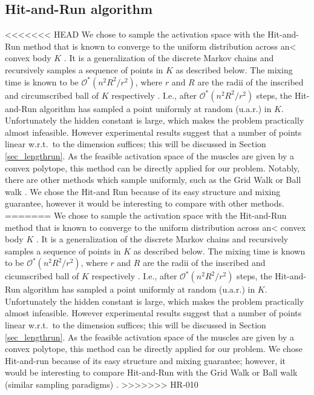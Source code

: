 \subsection{Hit-and-Run algorithm}
\label{ss:hitrun}
<<<<<<< HEAD
We chose to sample the activation space with the Hit-and-Run method that is known to converge to the uniform distribution across an< convex body $K$ \cite{smith1984efficient}. It is a generalization of the discrete Markov chains and recursively samples a sequence of points in $K$ as described below. The mixing time is known to be $\mathcal{O}^*(n^2R^2/r^2)$, where $r$ and $R$ are the radii of the inscribed and circumscribed ball of $K$ respectively \cite{Dyer, Lovasz}. I.e., after $\mathcal{O}^*(n^2R^2/r^2)$ steps, the Hit-and-Run algorithm has sampled a point uniformly at random (u.a.r.) in $K$. Unfortunately the hidden constant is large, which makes the problem practically almost infeasible. However experimental results suggest that a number of points linear w.r.t.\ to the dimension suffices; this will be discussed in Section \ref{sec_lengthrun}.
As the feasible activation space of the muscles are given by a convex polytope, this method can be directly applied for our problem. Notably, there are other methods which sample uniformly, such as the Grid Walk or Ball walk \cite{Vempala}. We chose the Hit-and Run because of its easy structure and mixing guarantee, however it would be interesting to compare with other methods.
=======
We chose to sample the activation space with the Hit-and-Run method that is known to converge to the uniform distribution across an< convex body $K$ \cite{smith1984efficient}.
It is a generalization of the discrete Markov chains and recursively samples a sequence of points in $K$ as described below.
The mixing time is known to be $\mathcal{O}^*(n^2R^2/r^2)$, where $r$ and $R$ are the radii of the inscribed and cicumscribed ball of $K$ respectively \cite{Dyer, Lovasz}.
I.e., after $\mathcal{O}^*(n^2R^2/r^2)$ steps, the Hit-and-Run algorithm has sampled a point uniformly at random (u.a.r.) in $K$.
Unfortunately the hidden constant is large, which makes the problem practically almost infeasible.
However experimental results suggest that a number of points linear w.r.t.\ to the dimension suffices; this will be discussed in Section \ref{sec_lengthrun}.
As the feasible activation space of the muscles are given by a convex polytope, this method can be directly applied for our problem.
We chose Hit-and-run because of its easy structure and mixing guarantee; however, it would be interesting to compare Hit-and-Run with the Grid Walk or Ball walk (similar sampling paradigms) \cite{Vempala}.
>>>>>>> HR-010

